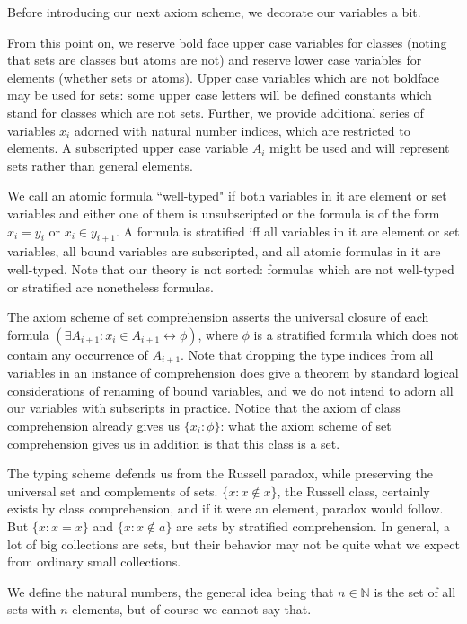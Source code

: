 \documentclass[12pt]{article}
\begin{document}
Before introducing our next axiom scheme, we decorate our variables a bit.

From this point on, we reserve bold face upper case variables for classes (noting that sets are classes but atoms are not)  and reserve lower case variables for elements (whether sets or atoms).  Upper case variables which are not boldface may be used for sets:  some upper case letters will be defined constants which stand for classes which are not sets.   Further, we provide additional series of variables $x_i$ adorned with natural number indices, which are  restricted to elements.  A subscripted upper case variable $A_i$ might be used and will represent sets rather than general elements.

We call an atomic formula ``well-typed" if both variables in it are element or set variables and either one of them is unsubscripted or the formula is of the form
$x_i = y_i$ or $x_i \in y_{i+1}$.  A formula is stratified iff all variables in it are element or set variables, all bound variables are subscripted, and all atomic formulas in it are well-typed.
Note that our theory is not sorted:  formulas which are not well-typed or stratified are nonetheless formulas.

The axiom scheme of set comprehension asserts the universal closure of each formula $(\exists A_{i+1}:x_i \in A_{i+1} \leftrightarrow \phi)$, where $\phi$ is a stratified formula
which does not contain any occurrence of $A_{i+1}$.  Note that dropping the type indices from all variables in an instance of comprehension does give a theorem by standard logical considerations of renaming of bound variables, and we do not intend to adorn all our variables with subscripts in practice.  Notice that the axiom of class comprehension already
gives us $\{x_i:\phi\}$:  what the axiom scheme of set comprehension gives us in addition is that this class is a set.

The typing scheme defends us from the Russell paradox, while preserving the universal set and complements of sets.  $\{x:x \not\in x\}$, the Russell class, certainly exists by class comprehension, and if it were an element, paradox would follow.  But $\{x : x = x\}$ and $\{x : x \not\in a\}$ are sets by stratified comprehension.  In general, a lot of big collections are sets, but their behavior may not be quite what we expect from ordinary small collections.

We define the natural numbers, the general idea being that $n \in \mathbb N$ is the set of all sets with $n$ elements, but of course we cannot say that.
\end{document}
